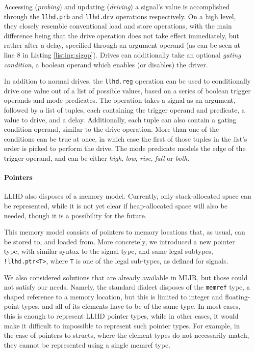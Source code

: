 Accessing (\textit{probing}) and updating (\textit{driving}) a signal's value is accomplished through the \texttt{llhd.prb} and \texttt{llhd.drv} operations respectively. On a high level, they closely resemble conventional load and store operations, with the main difference being that the drive operation does not take effect immediately, but rather after a delay, specified through an argument operand (as can be seen at line $8$ in Listing \ref{listing:sigop}). Drives can additionally take an optional \textit{gating condition}, a boolean operand which enables (or disables) the driver.

In addition to normal drives, the \texttt{llhd.reg} operation can be used to conditionally drive one value out of a list of possible values, based on a series of boolean trigger operands and mode predicates. The operation takes a signal as an argument, followed by a list of tuples, each containing the trigger operand and predicate, a value to drive, and a delay. Additionally, each tuple can also contain a gating condition operand, similar to the drive operation. More than one of the conditions can be true at once, in which case the first of those tuples in the list's order is picked to perform the drive. The mode predicate models the edge of the trigger operand, and can be either \textit{high}, \textit{low}, \textit{rise}, \textit{fall} or \textit{both}.

\paragraph{Pointers}
LLHD also disposes of a memory model. Currently, only stack-allocated space can be represented, while it is not yet clear if heap-allocated space will also be needed, though it is a possibility for the future.

This memory model consists of pointers to memory locations that, as usual,  can be stored to, and loaded from. More concretely, we introduced a new pointer type, with similar syntax to the signal type, and same legal subtypes, \ie \texttt{!llhd.ptr<T>}, where \texttt{T} is one of the legal sub-types, as defined for signals.

We also considered solutions that are already available in MLIR, but those could not satisfy our needs. Namely, the standard dialect disposes of the \texttt{memref} type, a shaped reference to a memory location, but this is limited to integer and floating-point types, and all of its elements have to be of the same type. In most cases, this is enough to represent LLHD pointer types, while in other cases, it would make it difficult to impossible to represent such pointer types. For example, in the case of pointers to structs, where the element types do not necessarily match, they cannot be represented using a single memref type.

